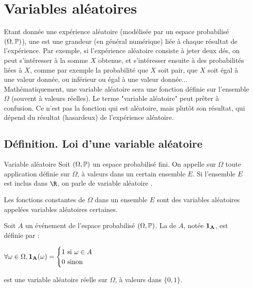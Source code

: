 \documentclass[12pt,a4paper]{report}
\begin{document}
\newpage

\section{Variables aléatoires}

Etant donnée une expérience aléatoire (modélisée par un espace probabilisé $(\Omega, \mathbb{P})$), une  est une grandeur (en général numérique) liée à chaque résultat de l'expérience. Par exemple, si l'expérience aléatoire consiste à jeter deux dés, on peut s'intéresser à la somme $X$ obtenue, et s'intéresser ensuite à des probabilités liées à $X$, comme par exemple la probabilité que $X$ soit pair, que $X$ soit égal à une valeur donnée, ou inférieur ou égal à une valeur donnée... \\

Mathématiquement, une variable aléatoire sera une fonction définie sur l'ensemble $\Omega$ (souvent à valeurs réelles). Le terme "variable aléatoire" peut prêter à confusion. Ce n'est pas la fonction qui est aléatoire, mais plutôt son résultat, qui dépend du résultat (hasardeux) de l'expérience aléatoire.

\subsection{Définition. Loi d'une variable aléatoire}

\begin{definition}{Variable aléatoire}{}
Soit $(\Omega, \mathbb{P})$ un espace probabilisé fini. On appelle  sur $\Omega$ toute application définie sur $\Omega$, à valeurs dans un certain ensemble $E$. Si l'ensemble $E$ est inclus dans $\R$, on parle de variable aléatoire .
\end{definition}

\begin{exemple}{}
Les fonctions constantes de $\Omega$ dans un ensemble $E$ sont des variables aléatoires appelées variables aléatoires certaines.
\end{exemple}

\begin{exemple}{}
Soit $A$ un événement de l'espace probabilisé $(\Omega,\mathbb{P})$. La  de $A$, notée $\bf{1}_A$, est définie par :
\begin{center}
$\forall \omega \in \Omega, \bf{1}_A(\omega) = \begin{cases} 1 \text{ si } \omega \in A \\ 0 \text{ sinon} \end{cases}$
\end{center}
est une variable aléatoire réelle sur $\Omega$, à valeurs dans $\{0,1\}$.
\end{exemple}
\end{document}
